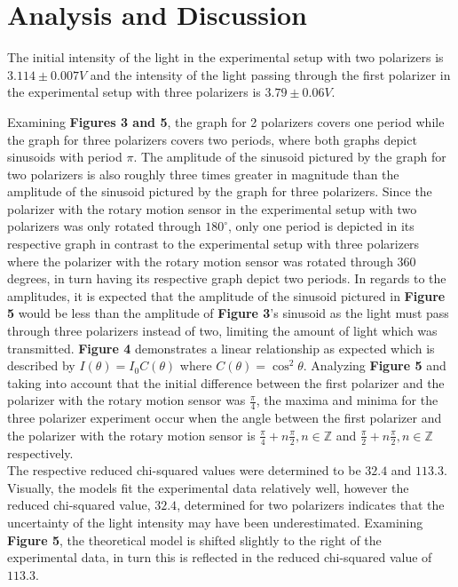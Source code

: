 \documentclass[
	letterpaper, %
	10pt, %
]{CSUniSchoolLabReport}
\begin{document}
\section{Analysis and Discussion}
The initial intensity of the light in the experimental setup with two polarizers is $3.114 \pm 0.007 V$ and the intensity
of the light passing through the first polarizer in the experimental setup with three polarizers is $3.79 \pm 0.06 V$.

Examining \textbf{Figures 3 and 5}, the graph for 2 polarizers covers one period while the graph for three polarizers covers
two periods, where both graphs depict sinusoids with period $\pi$. The amplitude of the sinusoid pictured by the graph for two polarizers is also roughly three times greater
in magnitude than the amplitude of the sinusoid pictured by the graph for three polarizers. Since the polarizer with the
rotary motion sensor in the experimental setup with two polarizers was only rotated through $180 ^\circ$, only one period
is depicted in its respective graph in contrast to the experimental setup with three polarizers where the polarizer with
the rotary motion sensor was rotated through 360 degrees, in turn having its respective graph depict two periods. In regards
to the amplitudes, it is expected that the amplitude of the sinusoid pictured in \textbf{Figure 5} would be less than the amplitude
of \textbf{Figure 3}'s sinusoid as the light must pass through three polarizers instead of two, limiting the amount of light which
was transmitted. \textbf{Figure 4} demonstrates a linear relationship as expected which is described by $I(\theta) = I_0C(\theta)$ where $C(\theta) = \cos^2\theta$.
Analyzing \textbf{Figure 5} and taking into account that the initial difference between the first polarizer and the
polarizer with the rotary motion sensor was $\frac{\pi}{4}$, the maxima and minima for the three polarizer experiment occur when the
angle between the first polarizer and the polarizer with the rotary motion sensor is $\frac{\pi}{4} + n\frac{\pi}{2}, n\in \mathbb{Z}$
and $\frac{\pi}{2}+n\frac{\pi}{2}, n\in\mathbb{Z}$ respectively.\\

The respective reduced chi-squared values were determined to be $32.4$ and $113.3$. Visually, the models fit the experimental
data relatively well, however the reduced chi-squared value, $32.4$, determined for two polarizers indicates that the uncertainty
of the light intensity may have been underestimated. Examining \textbf{Figure 5}, the theoretical model is shifted slightly to the
right of the experimental data, in turn this is reflected in the reduced chi-squared value of $113.3$.\\
\end{document}
